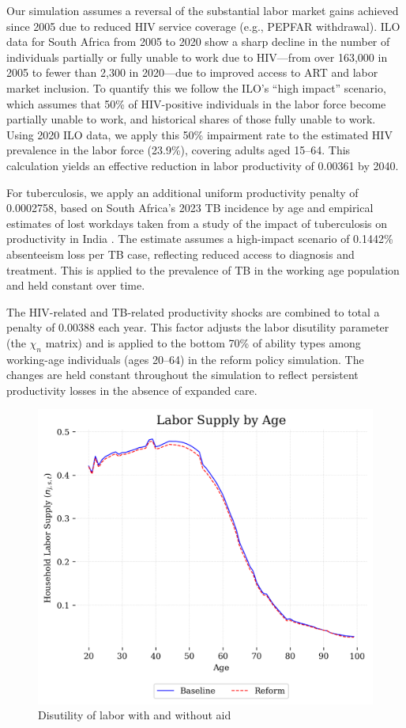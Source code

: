 \documentclass[letterpaper,12pt]{article}
\theoremstyle{definition}
\begin{document}
\begin{spacing}{1.5}
Our simulation assumes a reversal of the substantial labor market gains achieved since 2005 due to reduced HIV service coverage (e.g., PEPFAR withdrawal). ILO data for South Africa from 2005 to 2020 show a sharp decline in the number of individuals partially or fully unable to work due to HIV—from over 163,000 in 2005 to fewer than 2,300 in 2020—due to improved access to ART and labor market inclusion. To quantify this we follow the ILO’s “high impact” scenario, which assumes that 50\% of HIV-positive individuals in the labor force become partially unable to work, and historical shares of those fully unable to work. Using 2020 ILO data, we apply this 50\% impairment rate to the estimated HIV prevalence in the labor force (23.9\%), covering adults aged 15–64. This calculation yields an effective reduction in labor productivity of 0.00361 by 2040. 

For tuberculosis, we apply an additional uniform productivity penalty of 0.0002758, based on South Africa’s 2023 TB incidence by age and empirical estimates of lost workdays taken from a study of the impact of tuberculosis on productivity in India \citep{Keogh2024}. The estimate assumes a high-impact scenario of 0.1442\% absenteeism loss per TB case, reflecting reduced access to diagnosis and treatment. This is applied to the prevalence of TB in the working age population and held constant over time.

The HIV-related and TB-related productivity shocks are combined to total a penalty of 0.00388 each year. This factor adjusts the labor disutility parameter (the $\chi_n$ matrix) and is applied to the bottom 70\% of ability types among working-age individuals (ages 20–64) in the reform policy simulation. The changes are held constant throughout the simulation to reflect persistent productivity losses in the absence of expanded care.


\begin{figure}[H]
    \caption{Disutility of labor with and without aid}
    \centering
    \includegraphics[scale=0.75]{./tables_figures/labor_supply.png}
\end{figure}




\end{spacing}
\end{document}
